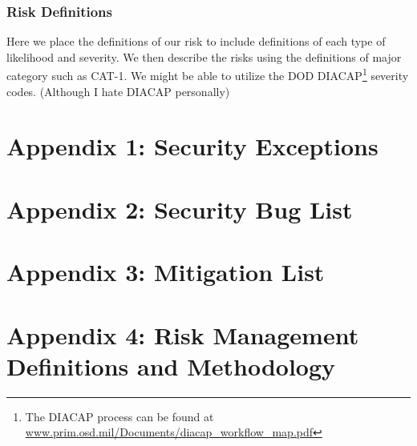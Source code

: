 \documentclass{tufte-book}
\begin{document}
\subsection{Risk Definitions}
Here we place the definitions of our risk to include definitions of each type of likelihood and severity.  We then describe the risks using the definitions of major category such as CAT-1.  We might be able to utilize the DOD DIACAP\footnote{The DIACAP process can be found at \url{www.prim.osd.mil/Documents/diacap_workflow_map.pdf}} severity codes.  (Although I hate DIACAP personally)

\cleardoublepage
\chapter{Appendix 1: Security Exceptions}
\label{ch:a1}


\cleardoublepage
\chapter{Appendix 2: Security Bug List}
\label{ch:a2}

\cleardoublepage
\chapter{Appendix 3: Mitigation List}
\label{ch:a3}

\cleardoublepage
\chapter{Appendix 4: Risk Management Definitions and Methodology}
\label{ch:a4}





\end{document}
